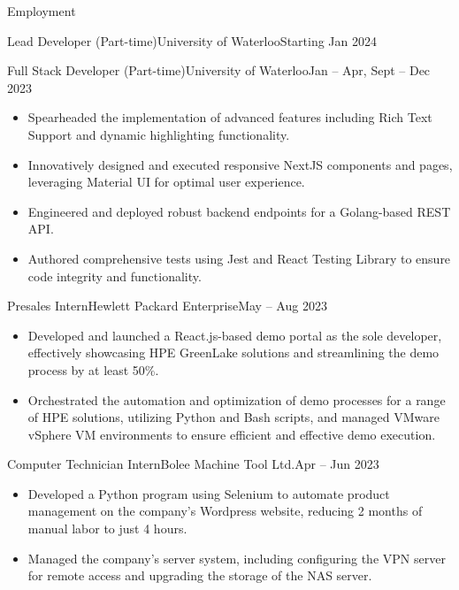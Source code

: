 \documentclass[]{mcdowellcv}
\begin{document}
	\makeheader
	
	\begin{cvsection}{Employment}
		\begin{cvsubsection}{Lead Developer (Part-time)}{University of Waterloo}{Starting Jan 2024}		
		\end{cvsubsection}
		\begin{cvsubsection}{Full Stack Developer (Part-time)}{University of Waterloo}{Jan -- Apr, Sept -- Dec 2023}
			\begin{itemize}
				\item Spearheaded the implementation of advanced features including Rich Text Support and dynamic highlighting functionality.
				\item Innovatively designed and executed responsive NextJS components and pages, leveraging Material UI for optimal user experience.
				\item Engineered and deployed robust backend endpoints for a Golang-based REST API.
				\item Authored comprehensive tests using Jest and React Testing Library to ensure code integrity and functionality.
			\end{itemize}
		\end{cvsubsection}
		\begin{cvsubsection}{Presales Intern}{Hewlett Packard Enterprise}{May -- Aug 2023}	
			\begin{itemize}
				\item Developed and launched a React.js-based demo portal as the sole developer, effectively showcasing HPE GreenLake solutions and streamlining the demo process by at least 50\%.
				\item Orchestrated the automation and optimization of demo processes for a range of HPE solutions, utilizing Python and Bash scripts, and managed VMware vSphere VM environments to ensure efficient and effective demo execution.
			\end{itemize}
		\end{cvsubsection}
		\begin{cvsubsection}{Computer Technician Intern}{Bolee Machine Tool Ltd.}{Apr -- Jun 2023}	
			\begin{itemize}
				\item Developed a Python program using Selenium to automate product management on the company’s Wordpress website, reducing 2 months of manual labor to just 4 hours.
				\item Managed the company’s server system, including configuring the VPN server for remote access and upgrading the storage of the NAS server.
			\end{itemize}
		\end{cvsubsection}
	\end{cvsection}
	
\end{document}
